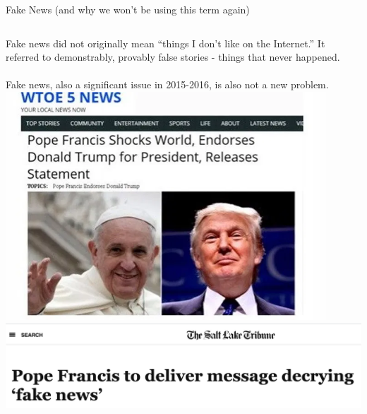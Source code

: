 \documentclass[nobackground,dvipsnames,table,aspectratio=169]{beamer}
\begin{document}
\begin{frame}{Fake News (and why we won't be using this term again)}
    \begin{columns}
            Fake news did not originally mean “things I don’t like on the Internet.”  It referred to demonstrably, provably false stories - things that never happened.\\~\\
            
            Fake news, also a significant issue in 2015-2016, is also not a new problem.
            \includegraphics[width=0.9\textwidth]{pope-endorses-trump-fake}
            \includegraphics[width=\textwidth]{pope-decries-fake-news}
    \end{columns}
\end{frame}
\end{document}
